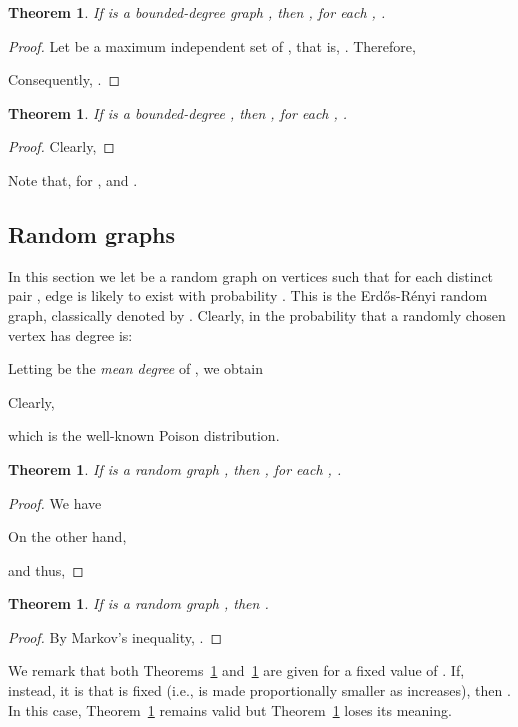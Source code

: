 \documentclass{article}
\newtheorem{thm}[lem]{Theorem}
\begin{document}
\begin{thm}
\label{PXBn}
If  is a bounded-degree graph , then
,
for each , .
\end{thm}

\begin{proof}
Let  be a maximum independent set of , that is,
. Therefore,

Consequently,
.
\end{proof}

\begin{thm}
\label{EXBn}
If  is a bounded-degree , then
, for each , .
\end{thm}
\begin{proof}
Clearly, 

\end{proof}

Note that, for ,  and
.

\subsection{Random graphs}

In this section we let  be a random graph on  vertices such that for each
distinct pair , edge  is likely to exist with probability
. This is the Erd\H{o}s-R\'{e}nyi random graph, classically denoted by
. Clearly, in  the probability that a randomly chosen vertex
 has degree  is:

Letting  be the \emph{mean degree} of , we obtain

Clearly, 

which is the well-known Poison distribution.
	
\begin{thm}
\label{EXGnp}
If  is a random graph , then , for each , .
\end{thm}

\begin{proof}
We have 

On the other hand,

and thus,
 
\end{proof}

\begin{thm}
\label{PXGnp}
If  is a random graph , then .
\end{thm}

\begin{proof}
By Markov's inequality,
.
\end{proof}

We remark that both Theorems~\ref{EXGnp} and~\ref{PXGnp} are given for a fixed
value of . If, instead, it is  that is fixed (i.e.,  is made
proportionally smaller as  increases), then
. In this case, Theorem~\ref{EXGnp}
remains valid but Theorem~\ref{PXGnp} loses its meaning.
\end{document}
